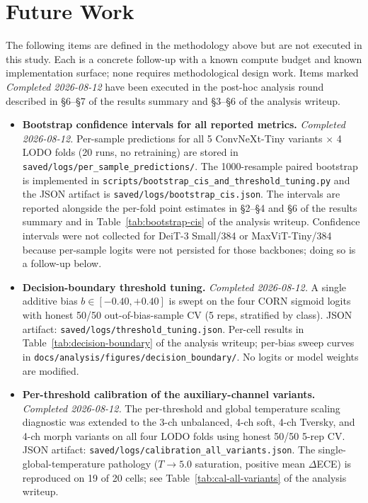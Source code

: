 \documentclass[11pt]{article}
\begin{document}
\section{Future Work}
\label{sec:future-work}
The following items are defined in the methodology above but are not executed in this study. Each is a concrete follow-up with a known compute budget and known implementation surface; none requires methodological design work. Items marked \emph{Completed 2026-08-12} have been executed in the post-hoc analysis round described in §6--§7 of the results summary and \S3--§6 of the analysis writeup.

\begin{itemize}[leftmargin=*, topsep=0pt]
  \item \textbf{Bootstrap confidence intervals for all reported metrics.} \emph{Completed 2026-08-12.} Per-sample predictions for all 5 ConvNeXt-Tiny variants $\times$ 4 LODO folds (20 runs, no retraining) are stored in \texttt{saved/logs/per\_sample\_predictions/}. The 1000-resample paired bootstrap is implemented in \texttt{scripts/bootstrap\_cis\_and\_threshold\_tuning.py} and the JSON artifact is \texttt{saved/logs/bootstrap\_cis.json}. The intervals are reported alongside the per-fold point estimates in §2--§4 and §6 of the results summary and in Table~\ref{tab:bootstrap-cis} of the analysis writeup. Confidence intervals were not collected for DeiT-3 Small/384 or MaxViT-Tiny/384 because per-sample logits were not persisted for those backbones; doing so is a follow-up below.
  \item \textbf{Decision-boundary threshold tuning.} \emph{Completed 2026-08-12.} A single additive bias $b \in [-0.40, +0.40]$ is swept on the four CORN sigmoid logits with honest 50/50 out-of-bias-sample CV (5 reps, stratified by class). JSON artifact: \texttt{saved/logs/threshold\_tuning.json}. Per-cell results in Table~\ref{tab:decision-boundary} of the analysis writeup; per-bias sweep curves in \texttt{docs/analysis/figures/decision\_boundary/}. No logits or model weights are modified.
  \item \textbf{Per-threshold calibration of the auxiliary-channel variants.} \emph{Completed 2026-08-12.} The per-threshold and global temperature scaling diagnostic was extended to the 3-ch unbalanced, 4-ch soft, 4-ch Tversky, and 4-ch morph variants on all four LODO folds using honest 50/50 5-rep CV. JSON artifact: \texttt{saved/logs/calibration\_all\_variants.json}. The single-global-temperature pathology ($T \to 5.0$ saturation, positive mean $\Delta$ECE) is reproduced on 19 of 20 cells; see Table~\ref{tab:cal-all-variants} of the analysis writeup.

\end{itemize}
\end{document}
